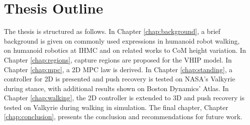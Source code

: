 \section{Thesis Outline}
The thesis is structured as follows. In Chapter \ref{chap:background}, a brief background is given on commonly used expressions in humanoid robot walking, on humanoid robotics at \ac{IHMC} and on related works to \ac{CoM} height variation. In Chapter \ref{chap:regions}, capture regions are proposed for the \ac{VHIP} model. In Chapter \ref{chap:mpc}, a \ac{2D} \ac{MPC} law is derived. In Chapter \ref{chap:standing}, a controller for \ac{2D} is presented and push recovery is tested on NASA's Valkyrie during stance, with additional results shown on Boston Dynamics' Atlas. In Chapter \ref{chap:walking}, the \ac{2D} controller is extended to \ac{3D} and push recovery is tested on Valkyrie during walking in simulation. The final chapter, Chapter \ref{chap:conclusion}, presents the conclusion and recommendations for future work.

